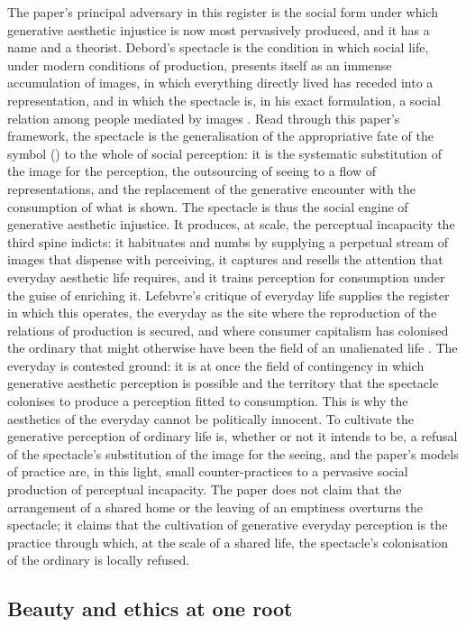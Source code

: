 The paper's principal adversary in this register is the social form under which generative aesthetic injustice is now most pervasively produced, and it has a name and a theorist. Debord's spectacle is the condition in which social life, under modern conditions of production, presents itself as an immense accumulation of images, in which everything directly lived has receded into a representation, and in which the spectacle is, in his exact formulation, a social relation among people mediated by images \parencite{debord1994}. Read through this paper's framework, the spectacle is the generalisation of the appropriative fate of the symbol () to the whole of social perception: it is the systematic substitution of the image for the perception, the outsourcing of seeing to a flow of representations, and the replacement of the generative encounter with the consumption of what is shown. The spectacle is thus the social engine of generative aesthetic injustice. It produces, at scale, the perceptual incapacity the third spine indicts: it habituates and numbs by supplying a perpetual stream of images that dispense with perceiving, it captures and resells the attention that everyday aesthetic life requires, and it trains perception for consumption under the guise of enriching it. Lefebvre's critique of everyday life supplies the register in which this operates, the everyday as the site where the reproduction of the relations of production is secured, and where consumer capitalism has colonised the ordinary that might otherwise have been the field of an unalienated life \parencite{lefebvre1991}. The everyday is contested ground: it is at once the field of contingency in which generative aesthetic perception is possible and the territory that the spectacle colonises to produce a perception fitted to consumption. This is why the aesthetics of the everyday cannot be politically innocent. To cultivate the generative perception of ordinary life is, whether or not it intends to be, a refusal of the spectacle's substitution of the image for the seeing, and the paper's models of practice are, in this light, small counter-practices to a pervasive social production of perceptual incapacity. The paper does not claim that the arrangement of a shared home or the leaving of an emptiness overturns the spectacle; it claims that the cultivation of generative everyday perception is the practice through which, at the scale of a shared life, the spectacle's colonisation of the ordinary is locally refused.

\subsection{Beauty and ethics at one root}
\label{p23:sub:dist-roots}

